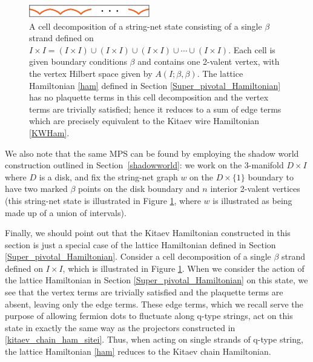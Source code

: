 \begin{figure}
\centering
\includegraphics[scale=2.5]{celldecompKitWire.pdf}
\caption{\label{celldecompKitWire} 
A cell decomposition of a string-net state consisting of a single $\beta$ strand defined on $I \times I = (I\times I) \cup (I \times I) \cup (I\times I) \cup  \cdots \cup (I\times I)$.
Each cell is given boundary conditions $\beta$ and contains one 2-valent vertex, with the vertex Hilbert space given by $A(I;\beta,\beta)$.
The lattice Hamiltonian \eqref{ham} defined in Section \ref{Super_pivotal_Hamiltonian} has no plaquette terms in this cell decomposition and the vertex terms are trivially satisfied; hence it reduces to a sum of edge terms which are precisely equivalent to the Kitaev wire Hamiltonian \eqref{KWHam}. }
\end{figure}

\medskip

 
We also note that the same MPS can be found by employing the shadow world construction outlined in Section~\ref{shadowworld}: we work on the 3-manifold $D\times I$ where $D$ is a disk,  
and fix the string-net graph $w$ on the $D \times \{1\}$ boundary to have two marked $\beta$ points on the disk boundary and $n$ interior 2-valent vertices (this string-net state is illustrated in Figure \ref{celldecompKitWire}, where $w$ is illustrated as being made up of a union of intervals). 

Finally, we should point out that the Kitaev Hamiltonian constructed in this section is just a special 
case of the lattice Hamiltonian defined in Section \ref{Super_pivotal_Hamiltonian}.
Consider a cell decomposition of a single $\beta$ strand defined on $I\times I$, which is illustrated in Figure \ref{celldecompKitWire}. 
When we consider the action of the lattice Hamiltonian in Section \ref{Super_pivotal_Hamiltonian} on this state, we see that 
the vertex terms are trivially satisfied and the plaquette terms are absent, leaving only the edge terms. 
These edge terms, which we recall serve the purpose of allowing fermion dots to fluctuate along q-type strings, act on this state in
exactly the same way as the projectors constructed in \eqref{kitaev_chain_ham_sitei}.  
Thus, when acting on single strands of q-type string, the lattice Hamiltonian \eqref{ham} reduces to the Kitaev chain Hamiltonian. 


